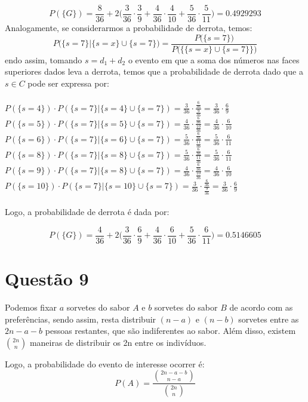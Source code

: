 \documentclass[a4paper,12pt]{report}
\begin{document}
$$P(\{G\})=\frac{8}{36}+2\bigg(\frac{3}{36}\cdot\frac{3}{9}+\frac{4}{36}\cdot\frac{4}{10} +\frac{5}{36}\cdot\frac{5}{11}\bigg)=0.4929293 $$
Analogamente, se considerarmos a probabilidade de derrota, temos:
$$
P\bigg(\{s=7\}|\{s=x\}\cup\{s=7\}\bigg)=
\frac{P\bigg(\{s=7\}\bigg)}{P\bigg( \bigg\{ \{s=x \}\cup\{s=7\}\bigg\} \bigg)} 
$$
endo assim, tomando $s=d_1+d_2$ o evento em que a soma dos números nas faces superiores dados leva a derrota, temos que a probabilidade de derrota dado que a $s\in C$ pode ser expressa por:\\
\\
$P(\{s=4\})\cdot P(\{s=7\}|\{s=4\} \cup \{s=7\}) = \frac{3}{36}\cdot\frac{\frac{6}{36}}{\frac{9}{36}}=\frac{3}{36}\cdot\frac{6}{9}$\\
$P(\{s=5\})\cdot P(\{s=7\}|\{s=5\} \cup \{s=7\}) = \frac{4}{36}\cdot\frac{\frac{6}{36}}{\frac{10}{36}}=\frac{4}{36}\cdot\frac{6}{10}$\\
$P(\{s=6\})\cdot P(\{s=7\}|\{s=6\} \cup \{s=7\}) = \frac{5}{36}\cdot\frac{\frac{6}{36}}{\frac{11}{36}}=\frac{5}{36}\cdot\frac{6}{11}$\\
$P(\{s=8\})\cdot P(\{s=7\}|\{s=8\} \cup \{s=7\}) = \frac{5}{36}\cdot\frac{\frac{6}{36}}{\frac{11}{36}}=\frac{5}{36}\cdot\frac{6}{11}$\\
$P(\{s=9\})\cdot P(\{s=7\}|\{s=8\} \cup \{s=7\}) =\frac{4}{36}\cdot\frac{\frac{6}{36}}{\frac{10}{36}}=\frac{4}{36}\cdot\frac{6}{10}$\\
$P(\{s=10\})\cdot P(\{s=7\}|\{s=10\} \cup \{s=7\}) = \frac{3}{36}\cdot\frac{\frac{6}{36}}{\frac{9}{36}}=\frac{3}{36}\cdot\frac{6}{9}$\\
\\
Logo, a probabilidade de derrota é dada por:

$$P(\{G\})=\frac{4}{36}+2\bigg(\frac{3}{36}\cdot\frac{6}{9}+\frac{4}{36}\cdot\frac{6}{10} +\frac{5}{36}\cdot\frac{6}{11}\bigg)=0.5146605 $$

\newpage

\section{Questão  9}
Podemos fixar $a$ sorvetes do sabor $A$ e $b$ sorvetes do sabor $B$ de acordo com as preferências, sendo assim, resta distribuir 
$(n-a)$ e $(n- b)$ sorvetes entre as $2n-a- b$ pessoas restantes, que são indiferentes ao sabor. Além disso, existem $ \binom{2n}{n}$ maneiras de distribuir os 2n entre os indivíduos.

Logo, a probabilidade do evento de interesse ocorrer é:
$$P(A) = \frac{\binom{2n-a- b}{n-a}}{\binom{2n}{n}} $$
\end{document}
